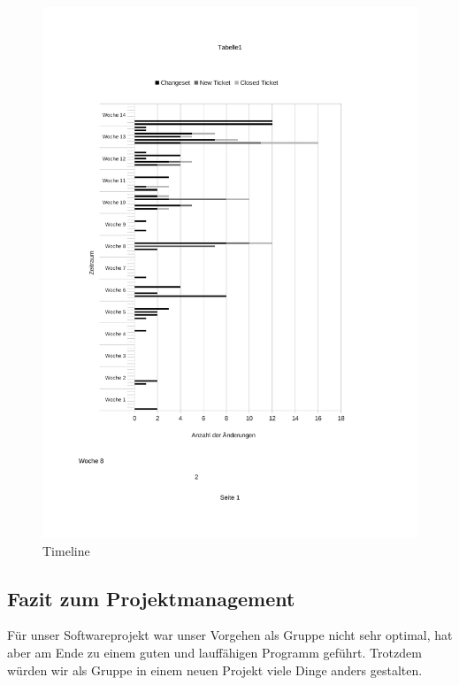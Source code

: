 \begin{figure}[htbp]
\centering
\includegraphics{03_pics/stat2.pdf}
\caption{Timeline}
\label{fig:activeTime}
\end{figure}


\subsection{Fazit zum Projektmanagement}
\label{subsec:fazitPM}

Für unser Softwareprojekt war unser Vorgehen als Gruppe nicht sehr optimal, hat aber am Ende zu einem guten und lauffähigen Programm geführt. Trotzdem würden wir als Gruppe in einem neuen Projekt viele Dinge anders gestalten.


